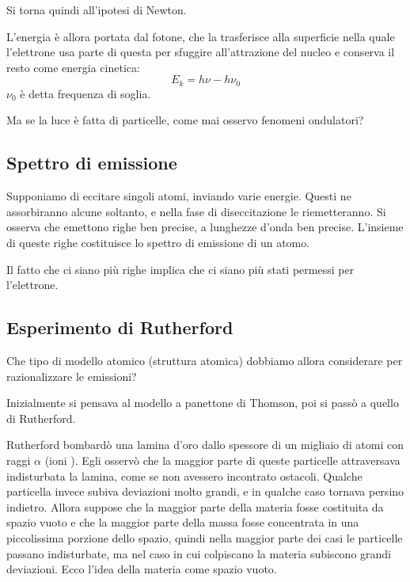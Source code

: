 Si torna quindi all'ipotesi di Newton.

L'energia è allora portata dal fotone, che la trasferisce alla superficie nella quale l'elettrone usa parte di questa per sfuggire all'attrazione del nucleo e conserva il resto come energia cinetica: %
$$E_k=h\nu-h\nu_0$$
$\nu_0$ è detta frequenza di soglia.

Ma se la luce è fatta di particelle, come mai osservo fenomeni ondulatori?
\subsection{Spettro di emissione}
Supponiamo di eccitare singoli atomi, inviando varie energie. Questi ne assorbiranno alcune soltanto, e nella fase di diseccitazione le riemetteranno. Si osserva che emettono righe ben precise, a lunghezze d'onda ben precise. L'insieme di queste righe costituisce lo spettro di emissione di un atomo.

Il fatto che ci siano più righe implica che ci siano più stati permessi per l'elettrone.
\subsection{Esperimento di Rutherford}
Che tipo di modello atomico (struttura atomica) dobbiamo allora considerare per razionalizzare le emissioni?

Inizialmente si pensava al modello a panettone di Thomson, poi si passò a quello di Rutherford.

Rutherford bombardò una lamina d'oro dallo spessore di un migliaio di atomi con raggi $\alpha$ (ioni ). Egli osservò che la maggior parte di queste particelle attraversava indisturbata la lamina, come se non avessero incontrato ostacoli.
Qualche particella invece subiva deviazioni molto grandi, e in qualche caso tornava persino indietro. Allora suppose che la maggior parte della materia fosse costituita da spazio vuoto e che la maggior parte della massa  fosse concentrata in una piccolissima porzione dello spazio, quindi nella maggior parte dei casi le particelle passano indisturbate, ma nel caso in cui colpiscano la materia subiscono grandi deviazioni. Ecco l'idea della materia come spazio vuoto.

